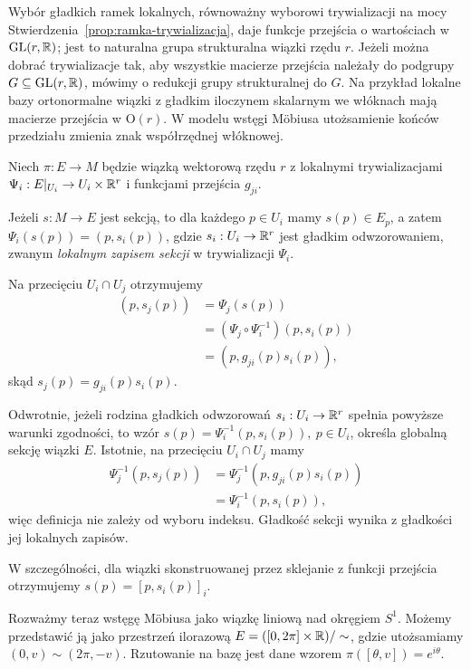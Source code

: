 \begin{uwaga}
Wybór gładkich ramek lokalnych, równoważny wyborowi trywializacji
na mocy Stwierdzenia~\ref{prop:ramka-trywializacja},
daje funkcje przejścia o wartościach w
$\mathrm{GL}(r,\mathbb{R})$; jest to
naturalna grupa strukturalna wiązki rzędu $r$. Jeżeli można dobrać
trywializacje tak, aby wszystkie macierze przejścia należały do podgrupy
$G\subseteq\mathrm{GL}(r,\mathbb{R})$, mówimy o redukcji grupy strukturalnej do $G$.
Na przykład lokalne bazy ortonormalne wiązki z gładkim iloczynem
skalarnym we włóknach mają macierze przejścia w $\mathrm{O}(r)$.
W modelu wstęgi Möbiusa utożsamienie końców przedziału
zmienia znak współrzędnej włóknowej.
\end{uwaga}


\begin{przyklad}
Niech $\pi:E\to M$ będzie wiązką wektorową rzędu $r$
z lokalnymi trywializacjami
$\Psi_i:E|_{U_i}\to U_i\times\mathbb{R}^r$ i funkcjami przejścia
$g_{ji}$.

Jeżeli $s:M\to E$ jest sekcją, to dla każdego $p\in U_i$
mamy $s(p)\in E_p$, a zatem $\Psi_i(s(p))=(p,s_i(p))$,
gdzie $s_i:U_i\to\mathbb{R}^r$ jest gładkim odwzorowaniem,
zwanym \emph{lokalnym zapisem sekcji} w trywializacji
$\Psi_i$.

Na przecięciu $U_i\cap U_j$ otrzymujemy
\[
\begin{aligned}
(p,s_j(p))
&=\Psi_j(s(p))\\
&=(\Psi_j\circ\Psi_i^{-1})(p,s_i(p))\\
&=(p,g_{ji}(p)s_i(p)),
\end{aligned}
\]
skąd $s_j(p)=g_{ji}(p)s_i(p)$.

Odwrotnie, jeżeli rodzina gładkich odwzorowań
$s_i:U_i\to\mathbb{R}^r$ spełnia powyższe warunki zgodności,
to wzór $s(p)=\Psi_i^{-1}(p,s_i(p)),\ p\in U_i$,
określa globalną sekcję wiązki $E$.
Istotnie, na przecięciu $U_i\cap U_j$ mamy
\[
\begin{aligned}
\Psi_j^{-1}(p,s_j(p))
&=\Psi_j^{-1}(p,g_{ji}(p)s_i(p))\\
&=\Psi_i^{-1}(p,s_i(p)),
\end{aligned}
\]
więc definicja nie zależy od wyboru indeksu.
Gładkość sekcji wynika z gładkości jej lokalnych
zapisów.

W szczególności, dla wiązki skonstruowanej przez
sklejanie z funkcji przejścia otrzymujemy $s(p)=[p,s_i(p)]_i$.

Rozważmy teraz wstęgę Möbiusa jako wiązkę liniową
nad okręgiem $S^1$. Możemy przedstawić ją jako
przestrzeń ilorazową $E=([0,2\pi]\times\mathbb{R})/\sim$,
gdzie utożsamiamy $(0,v)\sim(2\pi,-v)$.
Rzutowanie na bazę jest dane wzorem $\pi([\theta,v])=e^{i\theta}$.


\end{przyklad}
